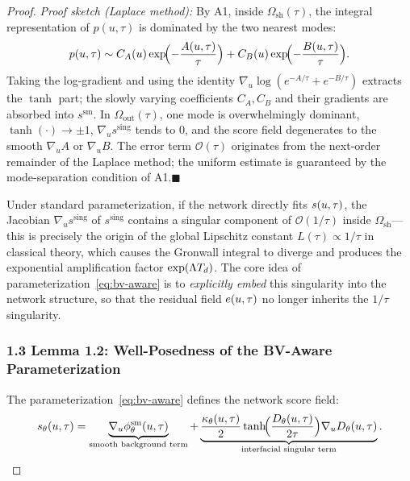 \begin{proof}
\textit{Proof sketch (Laplace method):} By A1, inside $\Omega_{\mathrm{sh}}(\tau)$, the integral representation of $p(u,\tau)$ is dominated by the two nearest modes:
\begin{equation}
  p(u, \tau) \sim C_A(u) \exp\!\Bigl(-\frac{A(u,\tau)}{\tau}\Bigr) + C_B(u) \exp\!\Bigl(-\frac{B(u,\tau)}{\tau}\Bigr).
\end{equation}
Taking the log-gradient and using the identity $\nabla_u \log(e^{-A/\tau} + e^{-B/\tau})$ extracts the $\tanh$ part; the slowly varying coefficients $C_A, C_B$ and their gradients are absorbed into $s^{\mathrm{sm}}$.
In $\Omega_{\mathrm{out}}(\tau)$, one mode is overwhelmingly dominant, $\tanh(\cdot) \to \pm 1$, $\nabla_u s^{\mathrm{sing}}$ tends to $0$, and the score field degenerates to the smooth $\nabla_u A$ or $\nabla_u B$.
The error term $\mathcal{O}(\tau)$ originates from the next-order remainder of the Laplace method; the uniform estimate is guaranteed by the mode-separation condition of A1.\hfill$\blacksquare$

\begin{remark}
Under standard parameterization, if the network directly fits $s(u,\tau)$, the Jacobian $\nabla_u s^{\mathrm{sing}}$ of $s^{\mathrm{sing}}$ contains a singular component of $\mathcal{O}(1/\tau)$ inside $\Omega_{\mathrm{sh}}$---this is precisely the origin of the global Lipschitz constant $L(\tau) \propto 1/\tau$ in classical theory, which causes the Gronwall integral to diverge and produces the exponential amplification factor $\exp(\Lambda T_d)$.
The core idea of parameterization~\eqref{eq:bv-aware} is to \emph{explicitly embed} this singularity into the network structure, so that the residual field $e(u,\tau)$ no longer inherits the $1/\tau$ singularity.
\end{remark}

\subsubsection{1.3 Lemma 1.2: Well-Posedness of the BV-Aware Parameterization}

The parameterization~\eqref{eq:bv-aware} defines the network score field:
\begin{equation}
  s_{\theta}(u, \tau) = \underbrace{\nabla_u \phi^{\mathrm{sm}}_{\theta}(u, \tau)}_{\text{smooth background term}} + \underbrace{\frac{\kappa_{\theta}(u,\tau)}{2} \tanh\!\Bigl(\frac{D_{\theta}(u, \tau)}{2\tau}\Bigr) \nabla_u D_{\theta}(u, \tau)}_{\text{interfacial singular term}}.
\end{equation}


\end{proof}
